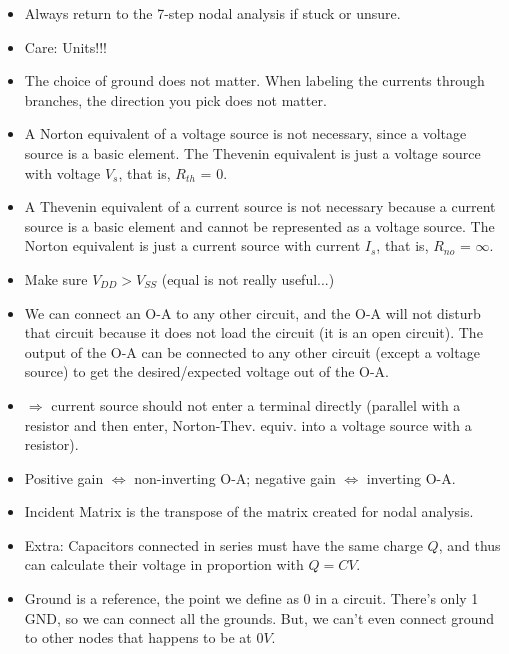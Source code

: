 \documentclass{article}
\begin{document}
\pagebreak
{}
\begin{itemize}
	\item Always return to the 7-step {\color{red} nodal analysis} if stuck or unsure.
	\item {\color{red} Care: Units!!!}
	\item The choice of ground does not matter. When labeling the currents through branches, the direction you pick does not matter.
	\item A Norton equivalent of a voltage source is not necessary, since a voltage source is a basic element. The Thevenin equivalent is just a voltage source with voltage $V_s$, that is, $R_{th}$ = 0.
	\item A Thevenin equivalent of a current source is not necessary because a current source is a basic element and cannot be represented as a voltage source. The Norton equivalent is just a current source with current $I_s$, that is, $R_{no}$ = $\infty$.
	\item Make sure $V_{DD} > V_{SS}$ (equal is not really useful...)
	\item We can connect an O-A to any other circuit, and the O-A will not disturb that circuit because it does not load the circuit (it is an open circuit). The output of the O-A can be connected to any other circuit (except a voltage source) to get the desired/expected voltage out of the O-A.
	\item $\Longrightarrow$ current source should not enter a terminal directly (parallel with a resistor and then enter, Norton-Thev. equiv. into a voltage source with a resistor).
	\item Positive gain $\iff$ non-inverting O-A; negative gain $\iff$ inverting O-A.
	\item Incident Matrix is the transpose of the matrix created for nodal analysis.
	\item Extra: Capacitors connected in series must have the same charge $Q$, and thus can calculate their voltage in proportion with $Q = CV$.
	\item Ground is a reference, the point we define as 0 in a circuit. There's only 1 GND, so we can connect all the grounds. But, we can't even connect ground to other nodes that happens to be at $0V$.
\end{itemize}
\end{document}
